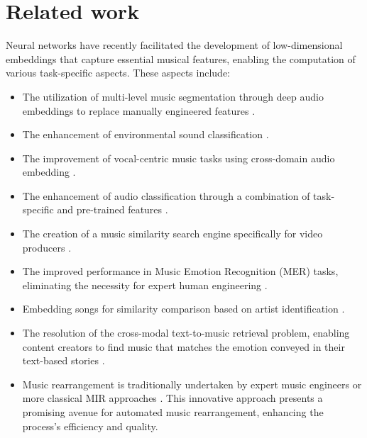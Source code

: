 \section{Related work}

Neural networks have recently facilitated the development of low-dimensional embeddings that capture essential musical features, enabling the computation of various task-specific aspects. These aspects include:

\begin{itemize}

\item The utilization of multi-level music segmentation through deep audio embeddings to replace manually engineered features \cite{SalamonDeepSegmentation}.

\item The enhancement of environmental sound classification \cite{Kim2020OneStrategies}.

\item The improvement of vocal-centric music tasks using cross-domain audio embedding \cite{Kim2021LearningLoss}.

\item The enhancement of audio classification through a combination of task-specific and pre-trained features \cite{Hung2022Feature-informedClassification}.

\item The creation of a music similarity search engine specifically for video producers \cite{epidemic}.

\item The improved performance in Music Emotion Recognition (MER) tasks, eliminating the necessity for expert human engineering \cite{KohComparisonRecognition}.

\item Embedding songs for similarity comparison based on artist identification \cite{contentmusicsimtriplet2020}.

\item The resolution of the cross-modal text-to-music retrieval problem, enabling content creators to find music that matches the emotion conveyed in their text-based stories \cite{WonEmotionStories}.

\item Music rearrangement is traditionally undertaken by expert music engineers or more classical MIR approaches \cite{Stoller2018IntuitiveTransitions}. This innovative approach presents a promising avenue for automated music rearrangement, enhancing the process's efficiency and quality. \cite{Plachouras2023MusicSegmentation}

\end{itemize}

